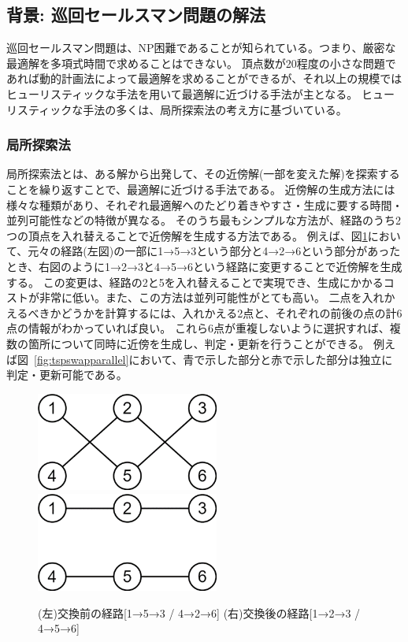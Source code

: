 \subsection*{背景: 巡回セールスマン問題の解法}
巡回セールスマン問題は、NP困難であることが知られている。つまり、厳密な最適解を多項式時間で求めることはできない。
頂点数が20程度の小さな問題であれば動的計画法によって最適解を求めることができるが、それ以上の規模ではヒューリスティックな手法を用いて最適解に近づける手法が主となる。
ヒューリスティックな手法の多くは、局所探索法の考え方に基づいている。
\subsubsection*{局所探索法}\label{sec:local}
局所探索法とは、ある解から出発して、その近傍解(一部を変えた解)を探索することを繰り返すことで、最適解に近づける手法である。
近傍解の生成方法には様々な種類があり、それぞれ最適解へのたどり着きやすさ・生成に要する時間・並列可能性などの特徴が異なる。
そのうち最もシンプルな方法が、経路のうち2つの頂点を入れ替えることで近傍解を生成する方法である。
例えば、図\ref{fig:tspswap}において、元々の経路(左図)の一部に1→5→3という部分と4→2→6という部分があったとき、右図のように1→2→3と4→5→6という経路に変更することで近傍解を生成する。
この変更は、経路の2と5を入れ替えることで実現でき、生成にかかるコストが非常に低い。また、この方法は並列可能性がとても高い。
二点を入れかえるべきかどうかを計算するには、入れかえる2点と、それぞれの前後の点の計6点の情報がわかっていれば良い。
これら6点が重複しないように選択すれば、複数の箇所について同時に近傍を生成し、判定・更新を行うことができる。
例えば図~\ref{fig:tspswapparallel}において、青で示した部分と赤で示した部分は独立に判定・更新可能である。
\begin{figure}[h]
    \label{fig:tspswap}
    \begin{center}
        \includegraphics[width=6cm]{figure/swap_bad.png}
        \includegraphics[width=6cm]{figure/swap_good.png}
        \caption{
            (左)交換前の経路[1→5→3 / 4→2→6]
            (右)交換後の経路[1→2→3 / 4→5→6]
        }
    \end{center}
\end{figure}

